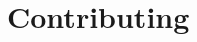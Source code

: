 \documentclass[../xdudla00-porting-Tang-to-Open-WRT.tex]{subfiles}
\begin{document}
\chapter{Contributing}\label{contrib}
\end{document}
